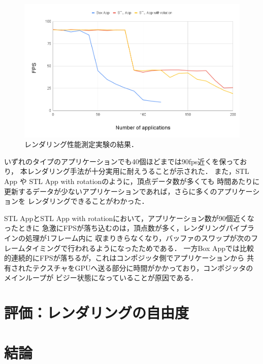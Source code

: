 \begin{figure}[htbp]
  \centering
  \includegraphics[keepaspectratio, width=\linewidth]{figures/rendering-fps.png}
  \caption{
    レンダリング性能測定実験の結果．
  }
  \label{fig:rendering-fps}
\end{figure}

いずれのタイプのアプリケーションでも40個ほどまでは90fps近くを保っており，
本レンダリング手法が十分実用に耐えうることが示された．
また，STL App や STL App with rotationのように，頂点データ数が多くても
時間あたりに更新するデータが少ないアプリケーションであれば，さらに多くのアプリケーションを
レンダリングできることがわかった．

STL AppとSTL App with rotationにおいて，アプリケーション数が90個近くなったときに
急激にFPSが落ち込むのは，頂点数が多く，レンダリングパイプラインの処理が1フレーム内に
収まりきらなくなり，バッファのスワップが次のフレームタイミングで行われるようになったためである．
一方Box Appでは比較的連続的にFPSが落ちるが，これはコンポジッタ側でアプリケーションから
共有されたテクスチャをGPUへ送る部分に時間がかかっており，コンポジッタのメインループが
ビジー状態になっていることが原因である．

\section{評価：レンダリングの自由度}


\section{結論}

